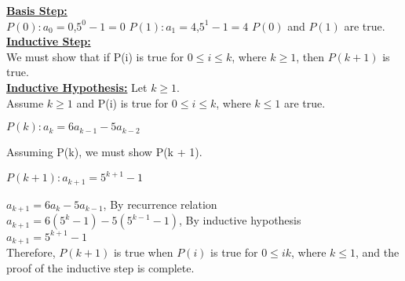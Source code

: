 \documentclass[a4paper]{article}
\begin{document}
\ul{\textbf{Basis Step:}}\\
$P(0): a_0 = 0$,\quad $5^0 - 1 = 0$
$P(1): a_1 = 4$,\quad $5^1 - 1 = 4$
$P(0)$ and $P(1)$ are true.\\

\ul{\textbf{Inductive Step:}}\\
We must show that if P(i) is true for $0 \le i \le k$, where $k \ge 1$, then $P(k + 1)$ is true.\\

\ul{\textbf{Inductive Hypothesis:}} Let $k \ge 1$.\\
Assume $k \ge 1$ and P(i) is true for $0 \le i \le k$, where $k \le 1$ are true.
\begin{center}
    $P(k): a_k = 6a_{k - 1} - 5a_{k - 2}$
\end{center}
Assuming P(k), we must show P(k + 1).
\begin{center}
    $P(k + 1): a_{k + 1} = 5^{k + 1} - 1$
\end{center}
$a_{k + 1} = 6a_{k} - 5a_{k - 1}$, By recurrence relation\\
$a_{k + 1} = 6(5^k - 1) - 5(5^{k - 1} - 1)$, By inductive hypothesis\\
$a_{k + 1} = 5^{k + 1} - 1$\\
Therefore, $P(k + 1)$ is true when $P(i)$ is true for $0 \le i k$, where $k \le 1$, and the proof of the inductive step is complete.
\end{document}
